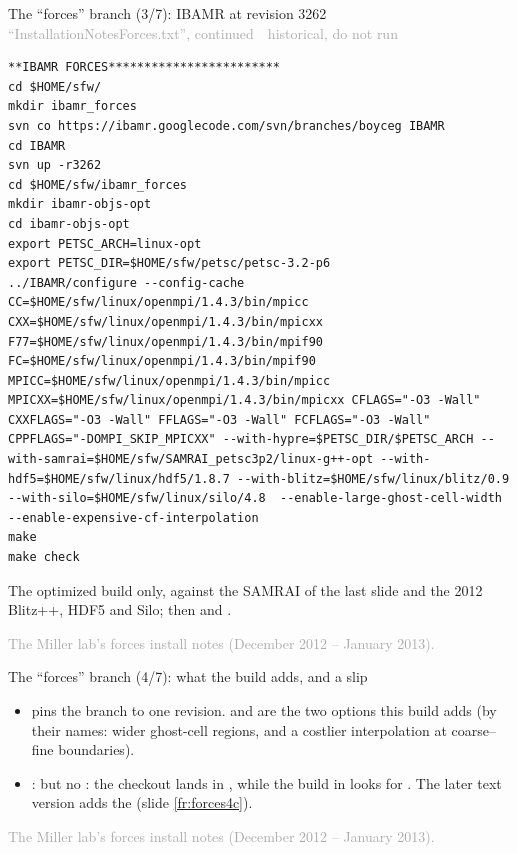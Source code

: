 \documentclass[aspectratio=169,11pt]{beamer}
\newcommand{\sourcecredit}[1]{\vfill\begin{flushright}\tiny\textcolor{DarkGray}{#1}\end{flushright}}
\newcommand{\hist}[1]{{\tiny\sffamily\textcolor{DarkGray}{#1\ \textbullet\ historical, do not run}}\par\nointerlineskip\vspace{0.3mm}}
\begin{document}
\begin{frame}[fragile]{The ``forces'' branch (3/7): IBAMR at revision 3262}
\label{fr:forces3}
\hist{``InstallationNotesForces.txt'', continued}
\begin{lstlisting}[style=hist]
**IBAMR FORCES************************
cd $HOME/sfw/
mkdir ibamr_forces
svn co https://ibamr.googlecode.com/svn/branches/boyceg IBAMR
cd IBAMR
svn up -r3262
cd $HOME/sfw/ibamr_forces
mkdir ibamr-objs-opt
cd ibamr-objs-opt
export PETSC_ARCH=linux-opt
export PETSC_DIR=$HOME/sfw/petsc/petsc-3.2-p6
../IBAMR/configure --config-cache CC=$HOME/sfw/linux/openmpi/1.4.3/bin/mpicc CXX=$HOME/sfw/linux/openmpi/1.4.3/bin/mpicxx F77=$HOME/sfw/linux/openmpi/1.4.3/bin/mpif90 FC=$HOME/sfw/linux/openmpi/1.4.3/bin/mpif90 MPICC=$HOME/sfw/linux/openmpi/1.4.3/bin/mpicc MPICXX=$HOME/sfw/linux/openmpi/1.4.3/bin/mpicxx CFLAGS="-O3 -Wall" CXXFLAGS="-O3 -Wall" FFLAGS="-O3 -Wall" FCFLAGS="-O3 -Wall" CPPFLAGS="-DOMPI_SKIP_MPICXX" --with-hypre=$PETSC_DIR/$PETSC_ARCH --with-samrai=$HOME/sfw/SAMRAI_petsc3p2/linux-g++-opt --with-hdf5=$HOME/sfw/linux/hdf5/1.8.7 --with-blitz=$HOME/sfw/linux/blitz/0.9 --with-silo=$HOME/sfw/linux/silo/4.8  --enable-large-ghost-cell-width --enable-expensive-cf-interpolation
make
make check
\end{lstlisting}
\footnotesize The optimized build only, against the SAMRAI of the last slide and the 2012 Blitz++, HDF5 and Silo; then  and .
\sourcecredit{The Miller lab's forces install notes (December 2012 -- January 2013).}
\end{frame}

\begin{frame}{The ``forces'' branch (4/7): what the build adds, and a slip}
\label{fr:forces3b}
\small
\begin{itemize}\setlength{\itemsep}{2pt}
  \item {} pins the branch to one revision.  and  are the two options this build adds (by their names: wider ghost-cell regions, and a costlier interpolation at coarse--fine boundaries).
  \item {}:  but no : the checkout lands in , while the build in  looks for . The later text version adds the  (slide \ref{fr:forces4c}).
\end{itemize}
\sourcecredit{The Miller lab's forces install notes (December 2012 -- January 2013).}
\end{frame}
\end{document}
